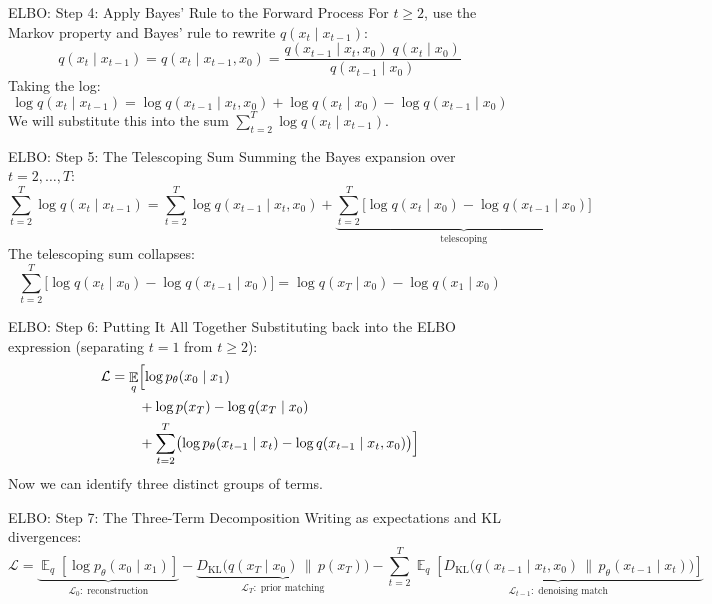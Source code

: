 \documentclass[10pt, aspectratio=169]{beamer}
\DeclareMathOperator*{\E}{\mathbb{E}}
\newcommand{\KL}{D_{\mathrm{KL}}}
\begin{document}
\begin{frame}{ELBO: Step 4: Apply Bayes' Rule to the Forward Process}
  For $t \geq 2$, use the Markov property and Bayes' rule to rewrite $q(x_t\mid x_{t-1})$:
  \[
    q(x_t \mid x_{t-1}) = q(x_t \mid x_{t-1}, x_0)
    = \frac{q(x_{t-1}\mid x_t, x_0)\;q(x_t\mid x_0)}{q(x_{t-1}\mid x_0)}
  \]
  Taking the log:
  \[
    \log q(x_t\mid x_{t-1}) = \log q(x_{t-1}\mid x_t, x_0) + \log q(x_t\mid x_0) - \log q(x_{t-1}\mid x_0)
  \]
  We will substitute this into the sum $\sum_{t=2}^{T} \log q(x_t \mid x_{t-1})$.
\end{frame}

\begin{frame}{ELBO: Step 5: The Telescoping Sum}
  Summing the Bayes expansion over $t = 2, \ldots, T$:
  \[
    \sum_{t=2}^{T}\log q(x_t\mid x_{t-1})
    = \sum_{t=2}^{T}\log q(x_{t-1}\mid x_t,x_0)
      + \underbrace{\sum_{t=2}^{T}\bigl[\log q(x_t\mid x_0) - \log q(x_{t-1}\mid x_0)\bigr]}_{\text{telescoping}}
  \]
  The telescoping sum collapses:
  \[
    \sum_{t=2}^{T}\bigl[\log q(x_t\mid x_0) - \log q(x_{t-1}\mid x_0)\bigr]
    = \log q(x_T\mid x_0) - \log q(x_1\mid x_0)
  \]
\end{frame}

\begin{frame}{ELBO: Step 6: Putting It All Together}
  Substituting back into the ELBO expression (separating $t=1$ from $t \geq 2$):
  \begin{align*}
    \mathcal{L} &= \E_q\Bigl[
      \log p_\theta(x_0\mid x_1) \\
      &\qquad + \log p(x_T) - \log q(x_T\mid x_0) \\
      &\qquad + \sum_{t=2}^{T}\bigl(\log p_\theta(x_{t-1}\mid x_t) - \log q(x_{t-1}\mid x_t, x_0)\bigr)
    \Bigr]
  \end{align*}
  Now we can identify three distinct groups of terms.
\end{frame}

\begin{frame}{ELBO: Step 7: The Three-Term Decomposition}
  Writing as expectations and KL divergences:
  \[
    \mathcal{L} =
    \underbrace{\E_q\!\left[\log p_\theta(x_0\mid x_1)\right]}_{\mathcal{L}_0:\;\text{reconstruction}}
    -\underbrace{\KL\!\bigl(q(x_T\mid x_0)\,\|\,p(x_T)\bigr)}_{\mathcal{L}_T:\;\text{prior matching}}
    -\sum_{t=2}^{T}\underbrace{\E_q\!\left[\KL\!\bigl(q(x_{t-1}\mid x_t,x_0)\,\|\,p_\theta(x_{t-1}\mid x_t)\bigr)\right]}_{\mathcal{L}_{t-1}:\;\text{denoising match}}
  \]
\end{frame}
\end{document}
